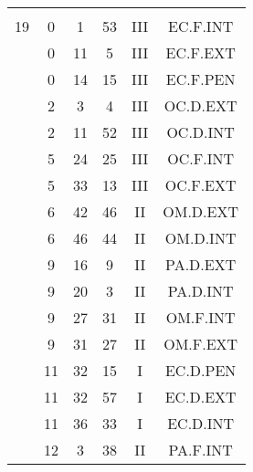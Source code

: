 \documentclass[12pt, a4paper]{article}
\begin{document}
\begin{multicols}{3}
{\begin{tabular}{c c c c c c}
	 	 	 	 & & & & & \\%
	 	 	 	19 & 0 & 1 & 53 & III & EC.F.INT\\%
	 	 	 	 & 0 & 11 & 5 & III & EC.F.EXT\\%
	 	 	 	 & 0 & 14 & 15 & III & EC.F.PEN\\%
	 	 	 	 & 2 & 3 & 4 & III & OC.D.EXT\\%
	 	 	 	 & 2 & 11 & 52 & III & OC.D.INT\\%
	 	 	 	 & 5 & 24 & 25 & III & OC.F.INT\\%
	 	 	 	 & 5 & 33 & 13 & III & OC.F.EXT\\%
	 	 	 	 & 6 & 42 & 46 & II & OM.D.EXT\\%
	 	 	 	 & 6 & 46 & 44 & II & OM.D.INT\\%
	 	 	 	 & 9 & 16 & 9 & II & PA.D.EXT\\%
	 	 	 	 & 9 & 20 & 3 & II & PA.D.INT\\%
	 	 	 	 & 9 & 27 & 31 & II & OM.F.INT\\%
	 	 	 	 & 9 & 31 & 27 & II & OM.F.EXT\\%
	 	 	 	 & 11 & 32 & 15 & I & EC.D.PEN\\%
	 	 	 	 & 11 & 32 & 57 & I & EC.D.EXT\\%
	 	 	 	 & 11 & 36 & 33 & I & EC.D.INT\\%
	 	 	 	 & 12 & 3 & 38 & II & PA.F.INT\\%
	 	 \end{tabular}
 	}
\end{multicols}
\end{document}
